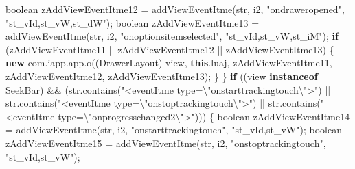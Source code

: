 \documentclass[
]{article}
\newenvironment{Shaded}{}{}
\newcommand{\ControlFlowTok}[1]{\textcolor[rgb]{0.00,0.44,0.13}{\textbf{#1}}}
\newcommand{\DataTypeTok}[1]{\textcolor[rgb]{0.56,0.13,0.00}{#1}}
\newcommand{\FunctionTok}[1]{\textcolor[rgb]{0.02,0.16,0.49}{#1}}
\newcommand{\KeywordTok}[1]{\textcolor[rgb]{0.00,0.44,0.13}{\textbf{#1}}}
\newcommand{\NormalTok}[1]{#1}
\newcommand{\OperatorTok}[1]{\textcolor[rgb]{0.40,0.40,0.40}{#1}}
\newcommand{\SpecialCharTok}[1]{\textcolor[rgb]{0.25,0.44,0.63}{#1}}
\newcommand{\StringTok}[1]{\textcolor[rgb]{0.25,0.44,0.63}{#1}}
\begin{document}
\begin{Shaded}
\begin{Highlighting}[]
            \DataTypeTok{boolean}\NormalTok{ zAddViewEventItme12 }\OperatorTok{=} \FunctionTok{addViewEventItme}\OperatorTok{(}\NormalTok{str}\OperatorTok{,}\NormalTok{ i2}\OperatorTok{,} \StringTok{"ondraweropened"}\OperatorTok{,} \StringTok{"st\_vId,st\_vW,st\_dW"}\OperatorTok{);}
            \DataTypeTok{boolean}\NormalTok{ zAddViewEventItme13 }\OperatorTok{=} \FunctionTok{addViewEventItme}\OperatorTok{(}\NormalTok{str}\OperatorTok{,}\NormalTok{ i2}\OperatorTok{,} \StringTok{"onoptionsitemselected"}\OperatorTok{,} \StringTok{"st\_vId,st\_vW,st\_iM"}\OperatorTok{);}
            \ControlFlowTok{if} \OperatorTok{(}\NormalTok{zAddViewEventItme11 }\OperatorTok{||}\NormalTok{ zAddViewEventItme12 }\OperatorTok{||}\NormalTok{ zAddViewEventItme13}\OperatorTok{)} \OperatorTok{\{}
                \KeywordTok{new}\NormalTok{ com}\OperatorTok{.}\FunctionTok{iapp}\OperatorTok{.}\FunctionTok{app}\OperatorTok{.}\FunctionTok{o}\OperatorTok{((}\NormalTok{DrawerLayout}\OperatorTok{)}\NormalTok{ view}\OperatorTok{,} \KeywordTok{this}\OperatorTok{.}\FunctionTok{luaj}\OperatorTok{,}\NormalTok{ zAddViewEventItme11}\OperatorTok{,}\NormalTok{ zAddViewEventItme12}\OperatorTok{,}\NormalTok{ zAddViewEventItme13}\OperatorTok{);}
            \OperatorTok{\}}
        \OperatorTok{\}}
        \ControlFlowTok{if} \OperatorTok{((}\NormalTok{view }\KeywordTok{instanceof}\NormalTok{ SeekBar}\OperatorTok{)} \OperatorTok{\&\&} \OperatorTok{(}\NormalTok{str}\OperatorTok{.}\FunctionTok{contains}\OperatorTok{(}\StringTok{"\textless{}eventItme type=}\SpecialCharTok{\textbackslash{}"}\StringTok{onstarttrackingtouch}\SpecialCharTok{\textbackslash{}"}\StringTok{\textgreater{}"}\OperatorTok{)} \OperatorTok{||}\NormalTok{ str}\OperatorTok{.}\FunctionTok{contains}\OperatorTok{(}\StringTok{"\textless{}eventItme type=}\SpecialCharTok{\textbackslash{}"}\StringTok{onstoptrackingtouch}\SpecialCharTok{\textbackslash{}"}\StringTok{\textgreater{}"}\OperatorTok{)} \OperatorTok{||}\NormalTok{ str}\OperatorTok{.}\FunctionTok{contains}\OperatorTok{(}\StringTok{"\textless{}eventItme type=}\SpecialCharTok{\textbackslash{}"}\StringTok{onprogresschanged2}\SpecialCharTok{\textbackslash{}"}\StringTok{\textgreater{}"}\OperatorTok{)))} \OperatorTok{\{}
            \DataTypeTok{boolean}\NormalTok{ zAddViewEventItme14 }\OperatorTok{=} \FunctionTok{addViewEventItme}\OperatorTok{(}\NormalTok{str}\OperatorTok{,}\NormalTok{ i2}\OperatorTok{,} \StringTok{"onstarttrackingtouch"}\OperatorTok{,} \StringTok{"st\_vId,st\_vW"}\OperatorTok{);}
            \DataTypeTok{boolean}\NormalTok{ zAddViewEventItme15 }\OperatorTok{=} \FunctionTok{addViewEventItme}\OperatorTok{(}\NormalTok{str}\OperatorTok{,}\NormalTok{ i2}\OperatorTok{,} \StringTok{"onstoptrackingtouch"}\OperatorTok{,} \StringTok{"st\_vId,st\_vW"}\OperatorTok{);}

\end{Highlighting}
\end{Shaded}
\end{document}
